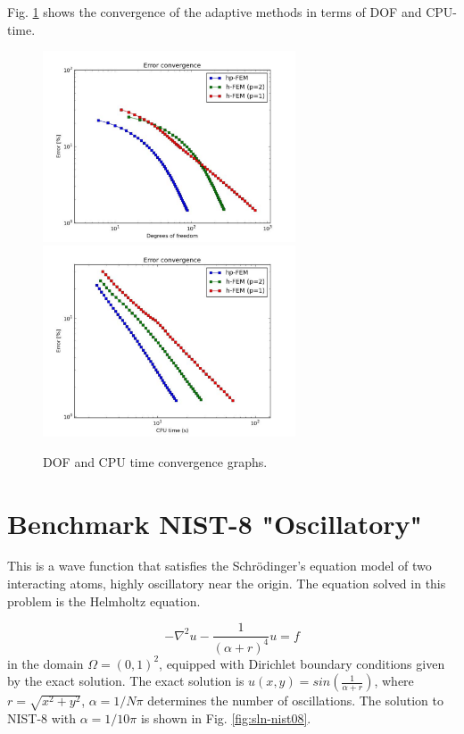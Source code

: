 \documentclass[12pt]{elsarticle}
\begin{document}
Fig. \ref{fig:nist-7-conv} shows the convergence of the adaptive methods in terms of DOF and CPU-time.

\begin{figure}[H]
\centering
\hspace{-50mm}
\includegraphics[width=7.5cm]{mafig45.pdf}\ \
\hspace{-10mm}
\includegraphics[width=7.5cm]{mafig46.pdf}
\hspace{-50mm}
\vspace{-2mm}
\caption{DOF and CPU time convergence graphs.}
\label{fig:nist-7-conv}
\end{figure}


\section{Benchmark NIST-8 "Oscillatory"}
\label{sec:bench-8}

This is a wave function that satisfies the Schr\"{o}dinger's equation model of two
interacting atoms, highly oscillatory near the origin.
The equation solved in this problem is the Helmholtz equation.

\begin{equation} \label{oscillatory}
-\nabla^{2} u - \frac{1}{(\alpha + r)^{4}} u = f
\end{equation}
in the domain $\Omega = (0, 1)^2$, equipped with Dirichlet boundary conditions
given by the exact solution. The exact solution is
$u(x,y) = sin(\frac{1}{\alpha + r})$,
where $r = \sqrt{x^{2} + y^{2}}$, $\alpha = 1 / N \pi$ determines the number of oscillations.
The solution to NIST-8 with $\alpha = 1 / 10 \pi$ is shown in Fig. \ref{fig:sln-nist08}.
\end{document}

